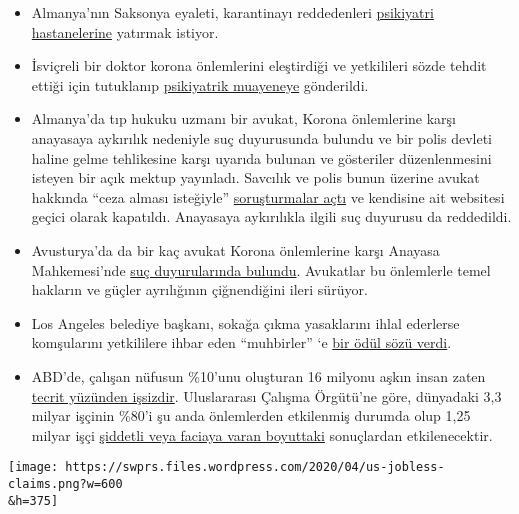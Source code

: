 \begin{itemize}
{  testleri yapıyor}.
\item
  Almanya'nın Saksonya eyaleti, karantinayı reddedenleri
  \href{https://www.welt.de/politik/deutschland/article207198029/Coronavirus-Sachsen-will-Quarantaene-Verweigerer-in-Psychiatrien-sperren.html}{psikiyatri
  hastanelerine} yatırmak istiyor.
\item
  İsviçreli bir doktor korona önlemlerini eleştirdiği ve yetkilileri
  sözde tehdit ettiği için tutuklanıp
  \href{https://www.blick.ch/news/schweiz/mittelland/in-baden-ag-polizei-in-vollmontur-im-einsatz-id15841510.html}{psikiyatrik
  muayeneye} gönderildi.
\item
  Almanya'da tıp hukuku uzmanı bir avukat, Korona önlemlerine karşı
  anayasaya aykırılık nedeniyle suç duyurusunda bulundu ve bir polis
  devleti haline gelme tehlikesine karşı uyarıda bulunan ve gösteriler
  düzenlenmesini isteyen bir açık mektup yayınladı. Savcılık ve polis
  bunun üzerine avukat hakkında ``ceza alması isteğiyle''
  \href{https://www.morgenweb.de/mannheimer-morgen_artikel,-coronavirus-aufruf-zu-straftaten-ermittlungen-gegen-heidelberger-rechtsanwaeltin-_arid,1627078.html}{soruşturmalar
  açtı} ve kendisine ait websitesi geçici olarak kapatıldı. Anayasaya
  aykırılıkla ilgili suç duyurusu da reddedildi.
\item
  Avusturya'da da bir kaç avukat Korona önlemlerine karşı Anayasa
  Mahkemesi'nde \href{https://wien.orf.at/stories/3043172/}{suç
  duyurularında bulundu}. Avukatlar bu önlemlerle temel hakların ve
  güçler ayrılığının çiğnendiğini ileri sürüyor.
\item
  Los Angeles belediye başkanı, sokağa çıkma yasaklarını ihlal ederlerse
  komşularını yetkililere ihbar eden ``muhbirler'' `e
  \href{https://townhall.com/tipsheet/bethbaumann/2020/04/04/la-mayor-garcetti-says-snitches-get-rewards-for-ratting-out-their-neighbors-n2566348}{bir
  ödül sözü verdi}.
\item
  ABD'de, çalışan nüfusun \%10'unu oluşturan 16 milyonu aşkın insan
  zaten
  \href{https://www.nytimes.com/2020/04/09/us/coronavirus-us-news.html}{tecrit
  yüzünden işsizdir}. Uluslararası Çalışma Örgütü'ne göre, dünyadaki 3,3
  milyar işçinin \%80'i şu anda önlemlerden etkilenmiş durumda olup 1,25
  milyar işçi
  \href{https://www.ilo.org/global/about-the-ilo/newsroom/news/WCMS_740893/lang--en/index.htm}{şiddetli
  veya faciaya varan boyuttaki} sonuçlardan etkilenecektir.
\end{itemize}

\texttt{[image: https://swprs.files.wordpress.com/2020/04/us-jobless-claims.png?w=600\\\&h=375]}

